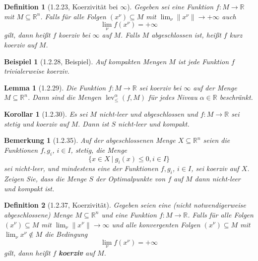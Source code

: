 \documentclass[12pt]{extreport} %
\newcommand{\R}{\mathbb{R}}
\theoremstyle{named}
\theoremstyle{nnamed}
\theoremstyle{itshape}
\newtheorem*{definition}{Definition}
\theoremstyle{normal}
\newtheorem*{beispiel}{Beispiel}
\newtheorem*{bemerkung}{Bemerkung}
\newtheorem*{korollar}{Korollar}
\newtheorem*{lemma}{Lemma}
\begin{document}
\begin{definition}[1.2.23, Koerzivität bei $\infty$]
	Gegeben sei eine Funktion $f \colon M \rightarrow \R$ mit $M \subseteq \R^n$. Falls für alle Folgen $(x^\nu) \subseteq M$ mit $\lim_\nu \| x^\nu \| \rightarrow +\infty$ auch
	$$ \lim_\nu f(x^\nu) = +\infty $$
	gilt, dann heißt $f$ koerziv bei $\infty$ auf $M$. Falls $M$ abgeschlossen ist, heißt $f$ kurz koerziv auf $M$.
\end{definition}

\begin{beispiel}[1.2.28, Beispiel]
	Auf kompakten Mengen $M$ ist jede Funktion $f$ trivialerweise koerziv.
\end{beispiel}
 
\begin{lemma}[1.2.29]
	Die Funktion $f \colon M \rightarrow \R$ sei koerziv bei $\infty$ auf der Menge $M \subseteq \R^n$. Dann sind die Mengen $\operatorname{lev}_{\leq}^{\alpha}(f, M)$ für jedes Niveau $\alpha \in \R$ beschränkt.	
\end{lemma}

\begin{korollar}[1.2.30]
	Es sei $M$ nicht-leer und abgeschlossen und $f \colon M \rightarrow \R$ sei stetig und koerziv auf $M$. Dann ist $S$ nicht-leer und kompakt.
\end{korollar}

\begin{bemerkung}[1.2.35]
	Auf der abgeschlossenen Menge $X \subseteq \R^n$ seien die Funktionen $f, g_i$, $i \in I$, stetig, die Menge 
	$$ \big\{ x \in X ~|~g_i(x) \leq0, i \in I \big\} $$
	 sei nicht-leer, und mindestens eine der Funktionen $f, g_i$, $i \in I$, sei koerziv auf $X$. Zeigen Sie, dass die Menge $S$ der Optimalpunkte von $f$ auf $M$ dann nicht-leer und kompakt ist.
\end{bemerkung}


\begin{definition}[1.2.37, Koerzivität]
	Gegeben seien eine (nicht notwendigerweise abgeschlossene) Menge $M \subseteq \R^n$ und eine Funktion $f \colon M \rightarrow \R$. Falls für alle Folgen $(x^\nu) \subseteq M$ mit $\lim_\nu \| x^\nu \| \rightarrow \infty$ und alle konvergenten Folgen $(x^\nu) \subseteq M$ mit $\lim_\nu x^\nu \notin M$ die Bedingung 
	$$ \lim_\nu f(x^\nu) = +\infty $$
	gilt, dann heißt $f$ \textbf{koerziv} auf $M$.
\end{definition}
\end{document}

